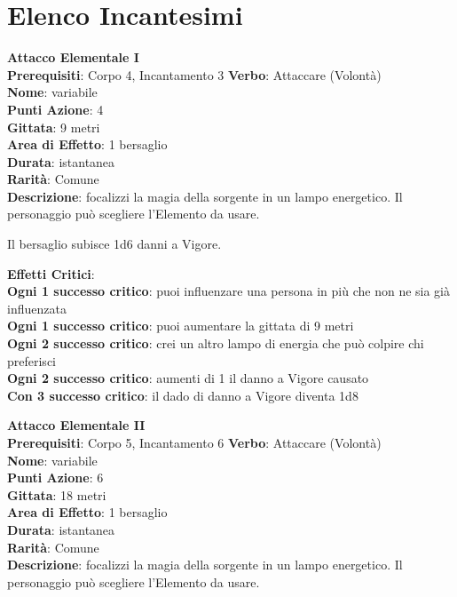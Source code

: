 \documentclass[12pt,a4paper,twoside,openany]{book}
\begin{document}
\pagebreak

\section{Elenco Incantesimi}

\begin{multicols}{2}


\textbf{Attacco Elementale I}\\
\textbf{Prerequisiti}: Corpo 4, Incantamento 3
\textbf{Verbo}: Attaccare (Volontà)\\
\textbf{Nome}: variabile\\
\textbf{Punti Azione}: 4\\
\textbf{Gittata}: 9 metri\\
\textbf{Area di Effetto}: 1 bersaglio\\
\textbf{Durata}: istantanea\\
\textbf{Rarità}: Comune\\
\textbf{Descrizione}: focalizzi la magia della sorgente in un lampo energetico. Il personaggio può scegliere l'Elemento da usare.

Il bersaglio subisce 1d6 danni a Vigore.


\textbf{Effetti Critici}:\\
\textbf{Ogni 1 successo critico}: puoi influenzare una persona in più che non ne sia già influenzata\\
\textbf{Ogni 1 successo critico}: puoi aumentare la gittata di 9 metri\\
\textbf{Ogni 2 successo critico}: crei un altro lampo di energia che può colpire chi preferisci\\
\textbf{Ogni 2 successo critico}: aumenti di 1 il danno a Vigore causato\\
\textbf{Con 3 successo critico}: il dado di danno a Vigore diventa 1d8

\textbf{Attacco Elementale II}\\
\textbf{Prerequisiti}: Corpo 5, Incantamento 6
\textbf{Verbo}: Attaccare (Volontà)\\
\textbf{Nome}: variabile\\
\textbf{Punti Azione}: 6\\
\textbf{Gittata}: 18 metri\\
\textbf{Area di Effetto}: 1 bersaglio\\
\textbf{Durata}: istantanea\\
\textbf{Rarità}: Comune\\
\textbf{Descrizione}: focalizzi la magia della sorgente in un lampo energetico. Il personaggio può scegliere l'Elemento da usare.


\end{multicols}
\end{document}
